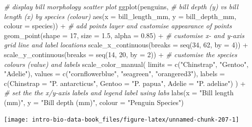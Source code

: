 \documentclass[
]{book}
\newenvironment{Shaded}{\begin{snugshade}}{\end{snugshade}}
\newcommand{\AttributeTok}[1]{\textcolor[rgb]{0.77,0.63,0.00}{#1}}
\newcommand{\CommentTok}[1]{\textcolor[rgb]{0.56,0.35,0.01}{\textit{#1}}}
\newcommand{\DecValTok}[1]{\textcolor[rgb]{0.00,0.00,0.81}{#1}}
\newcommand{\FloatTok}[1]{\textcolor[rgb]{0.00,0.00,0.81}{#1}}
\newcommand{\FunctionTok}[1]{\textcolor[rgb]{0.00,0.00,0.00}{#1}}
\newcommand{\NormalTok}[1]{#1}
\newcommand{\SpecialCharTok}[1]{\textcolor[rgb]{0.00,0.00,0.00}{#1}}
\newcommand{\StringTok}[1]{\textcolor[rgb]{0.31,0.60,0.02}{#1}}
\begin{document}
\begin{Shaded}
\begin{Highlighting}[]
\CommentTok{\# display bill morphology scatter plot}
\FunctionTok{ggplot}\NormalTok{(penguins, }
       \CommentTok{\# bill depth (y) vs bill length (x) by species (colour)}
       \FunctionTok{aes}\NormalTok{(}\AttributeTok{x =}\NormalTok{ bill\_length\_mm, }\AttributeTok{y =}\NormalTok{ bill\_depth\_mm, }\AttributeTok{colour =}\NormalTok{ species)) }\SpecialCharTok{+} 
  \CommentTok{\# add points layer and customise appearance of points}
  \FunctionTok{geom\_point}\NormalTok{(}\AttributeTok{shape =} \DecValTok{17}\NormalTok{, }\AttributeTok{size =} \FloatTok{1.5}\NormalTok{, }\AttributeTok{alpha =} \FloatTok{0.85}\NormalTok{) }\SpecialCharTok{+} 
  \CommentTok{\# customise x{-} and y{-}axis grid line and label locations}
  \FunctionTok{scale\_x\_continuous}\NormalTok{(}\AttributeTok{breaks =} \FunctionTok{seq}\NormalTok{(}\DecValTok{34}\NormalTok{, }\DecValTok{62}\NormalTok{, }\AttributeTok{by =} \DecValTok{4}\NormalTok{)) }\SpecialCharTok{+}
  \FunctionTok{scale\_y\_continuous}\NormalTok{(}\AttributeTok{breaks =} \FunctionTok{seq}\NormalTok{(}\DecValTok{14}\NormalTok{, }\DecValTok{20}\NormalTok{, }\AttributeTok{by =} \DecValTok{2}\NormalTok{)) }\SpecialCharTok{+} 
  \CommentTok{\# customise the species colours (\textquotesingle{}value\textquotesingle{}) and labels}
  \FunctionTok{scale\_color\_manual}\NormalTok{(}
    \AttributeTok{limits =} \FunctionTok{c}\NormalTok{(}\StringTok{"Chinstrap"}\NormalTok{, }\StringTok{"Gentoo"}\NormalTok{, }\StringTok{"Adelie"}\NormalTok{),}
    \AttributeTok{values =} \FunctionTok{c}\NormalTok{(}\StringTok{"cornflowerblue"}\NormalTok{, }\StringTok{"seagreen"}\NormalTok{, }\StringTok{"orangered3"}\NormalTok{),}
    \AttributeTok{labels =} \FunctionTok{c}\NormalTok{(}\AttributeTok{Chinstrap =} \StringTok{"P. antarcticus"}\NormalTok{, }\AttributeTok{Gentoo =} \StringTok{"P. papua"}\NormalTok{, }\AttributeTok{Adelie =} \StringTok{"P. adeliae"}\NormalTok{)}
\NormalTok{  ) }\SpecialCharTok{+}
  \CommentTok{\# set the the x/y{-}axis labels and legend label using \textasciigrave{}labs\textasciigrave{}}
  \FunctionTok{labs}\NormalTok{(}\AttributeTok{x =} \StringTok{"Bill length (mm)"}\NormalTok{, }\AttributeTok{y =} \StringTok{"Bill depth (mm)"}\NormalTok{, }\AttributeTok{colour =} \StringTok{"Penguin Species"}\NormalTok{)}
\end{Highlighting}
\end{Shaded}

\begin{center}\texttt{[image: intro-bio-data-book\_files/figure-latex/unnamed-chunk-207-1]} \end{center}
\end{document}
